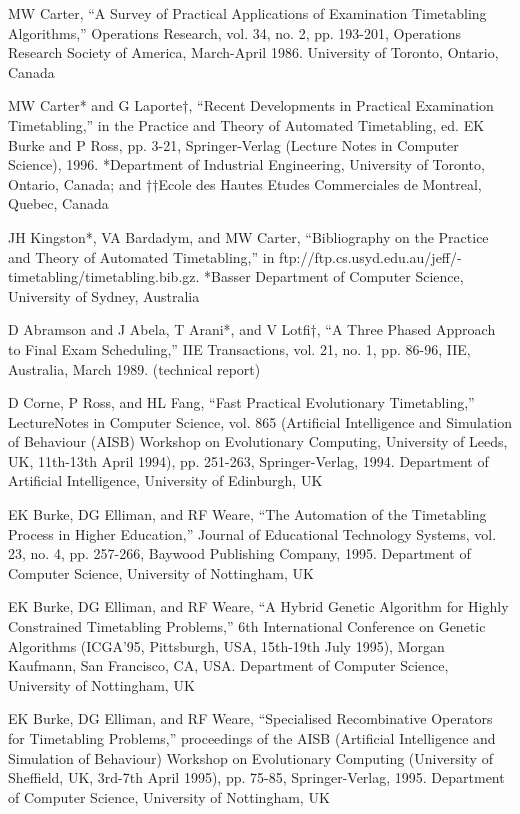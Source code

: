 \begin{thebibliography}{99}
 MW Carter, “A Survey of Practical Applications of Examination Timetabling Algorithms,”
Operations Research, vol. 34, no. 2, pp. 193-201, Operations Research Society
of America, March-April 1986. University of Toronto, Ontario, Canada

 MW Carter* and G Laporte†, “Recent Developments in Practical Examination Timetabling,”
in the Practice and Theory of Automated Timetabling, ed. EK Burke and P
Ross, pp. 3-21, Springer-Verlag (Lecture Notes in Computer Science), 1996.
*Department of Industrial Engineering, University of Toronto, Ontario, Canada;
and ††Ecole des Hautes Etudes Commerciales de Montreal, Quebec, Canada

 JH Kingston*, VA Bardadym, and MW Carter, “Bibliography on the Practice and
Theory of Automated Timetabling,” in ftp://ftp.cs.usyd.edu.au/jeff/-
timetabling/timetabling.bib.gz. *Basser Department of Computer Science,
University of Sydney, Australia

D Abramson and J Abela, T Arani*, and V Lotfi†, “A Three Phased Approach to
Final Exam Scheduling,” IIE Transactions, vol. 21, no. 1, pp. 86-96, IIE, Australia,
March 1989. (technical report)

D Corne, P Ross, and HL Fang, “Fast Practical Evolutionary Timetabling,” LectureNotes in Computer Science, vol. 865 (Artificial Intelligence and Simulation of
Behaviour (AISB) Workshop on Evolutionary Computing, University of Leeds, UK,
11th-13th April 1994), pp. 251-263, Springer-Verlag, 1994. Department of Artificial
Intelligence, University of Edinburgh, UK

EK Burke, DG Elliman, and RF Weare, “The Automation of the Timetabling Process in Higher Education,” Journal of Educational Technology Systems, vol. 23, no. 4,
pp. 257-266, Baywood Publishing Company, 1995. Department of Computer Science,
University of Nottingham, UK

EK Burke, DG Elliman, and RF Weare, “A Hybrid Genetic Algorithm for Highly Constrained Timetabling Problems,” 6th International Conference on Genetic Algorithms
(ICGA’95, Pittsburgh, USA, 15th-19th July 1995), Morgan Kaufmann, San Francisco,
CA, USA. Department of Computer Science, University of Nottingham, UK

EK Burke, DG Elliman, and RF Weare, “Specialised Recombinative Operators for Timetabling Problems,” proceedings of the AISB (Artificial Intelligence and Simulation
of Behaviour) Workshop on Evolutionary Computing (University of Sheffield, UK, 3rd-7th
April 1995), pp. 75-85, Springer-Verlag, 1995. Department of Computer Science,
University of Nottingham, UK

\end{thebibliography}
